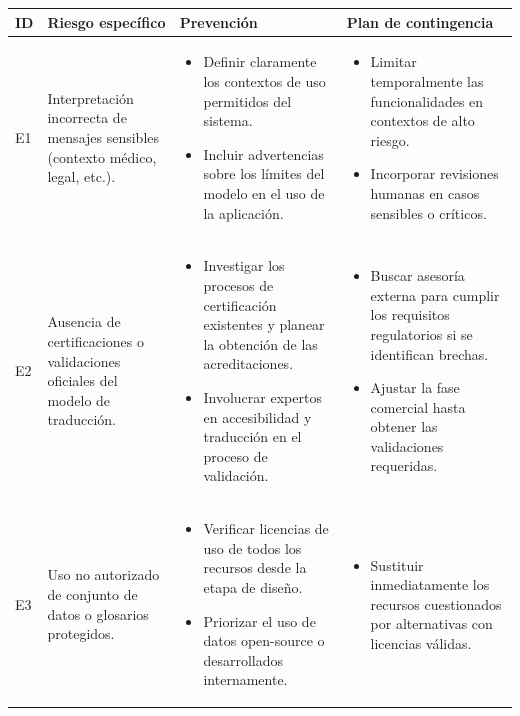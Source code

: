 \begin{longtable}{|>{\centering\arraybackslash}p{0.8cm}|>{\raggedright\arraybackslash}p{3.5cm}|>{\raggedright\arraybackslash}p{5.1cm}|>{\raggedright\arraybackslash}p{5.1cm}|}
	\hline
	\textbf{ID} & \textbf{Riesgo específico} & \textbf{Prevención} & \textbf{Plan de contingencia} \\
	\hline
	E1 & Interpretación incorrecta de mensajes sensibles (contexto médico, legal, etc.). &
	\begin{itemize}
		\item Definir claramente los contextos de uso permitidos del sistema.
		\item Incluir advertencias sobre los límites del modelo en el uso de la aplicación.
	\end{itemize} &
	\begin{itemize}
		\item Limitar temporalmente las funcionalidades en contextos de alto riesgo.
		\item Incorporar revisiones humanas en casos sensibles o críticos.
	\end{itemize} \\
	\hline
	E2 & Ausencia de certificaciones o validaciones oficiales del modelo de traducción. &
	\begin{itemize}
		\item Investigar los procesos de certificación existentes y planear la obtención de las acreditaciones.
		\item Involucrar expertos en accesibilidad y traducción en el proceso de validación.
	\end{itemize} &
	\begin{itemize}
		\item Buscar asesoría externa para cumplir los requisitos regulatorios si se identifican brechas.
		\item Ajustar la fase comercial hasta obtener las validaciones requeridas.
	\end{itemize} \\
	\hline
	E3 & Uso no autorizado de conjunto de datos o glosarios protegidos. &
	\begin{itemize}
		\item Verificar licencias de uso de todos los recursos desde la etapa de diseño.
		\item Priorizar el uso de datos open-source o desarrollados internamente.
	\end{itemize} &
	\begin{itemize}
		\item Sustituir inmediatamente los recursos cuestionados por alternativas con licencias válidas.

\end{itemize}
\end{longtable}
